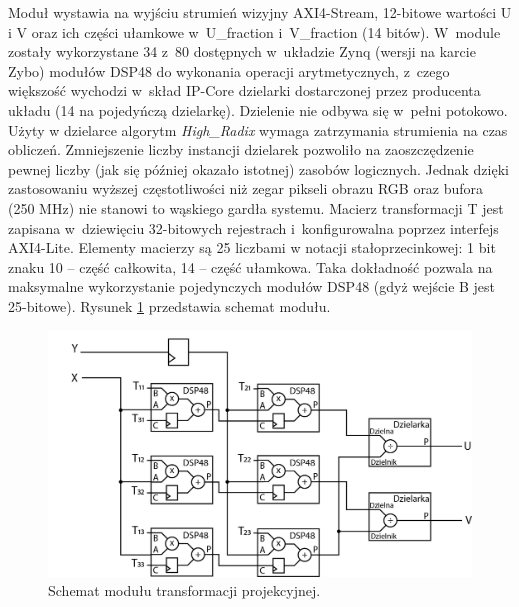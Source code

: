 Moduł wystawia na wyjściu strumień wizyjny AXI4-Stream, 12-bitowe wartości U i V oraz ich części ułamkowe w~U\_fraction i~V\_fraction (14 bitów). 
W~module zostały wykorzystane 34 z~80 dostępnych w~układzie Zynq (wersji na karcie Zybo) modułów DSP48 do wykonania operacji arytmetycznych, z~czego większość wychodzi w~skład IP-Core dzielarki dostarczonej przez producenta układu (14 na pojedyńczą dzielarkę).
Dzielenie nie odbywa się w~pełni potokowo. 
Użyty w dzielarce algorytm \textit{High\_Radix} wymaga zatrzymania strumienia na czas obliczeń. 
Zmniejszenie liczby instancji dzielarek pozwoliło na zaoszczędzenie pewnej liczby (jak się później okazało istotnej) zasobów logicznych.
Jednak dzięki zastosowaniu wyższej częstotliwości niż zegar pikseli obrazu RGB oraz bufora (250 MHz) nie stanowi to wąskiego gardła systemu. 
Macierz transformacji T jest zapisana w~dziewięciu 32-bitowych rejestrach i~konfigurowalna poprzez interfejs AXI4-Lite.
Elementy macierzy są 25 liczbami w notacji stałoprzecinkowej: 1 bit znaku 10 -- część całkowita, 14 -- część ułamkowa. 
Taka dokładność pozwala na maksymalne wykorzystanie pojedynczych modułów DSP48 (gdyż wejście B jest 25-bitowe). 
Rysunek \ref{fig:transfProjek} przedstawia schemat modułu.
\begin{figure}
\centering
\includegraphics[width=0.70\linewidth]{images/transfProjek.png}
\caption[Schemat modułu transformacji projekcyjnej.]{Schemat modułu transformacji projekcyjnej.}
\label{fig:transfProjek}
\end{figure}

